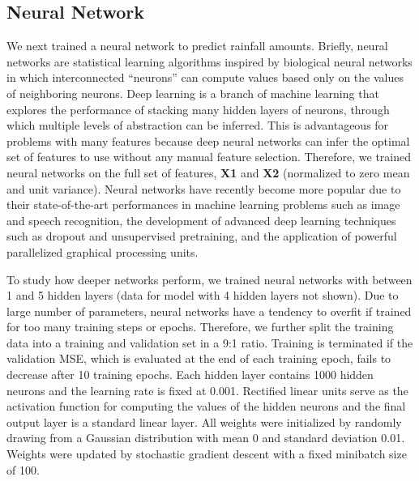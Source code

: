 \documentclass[12pt] {article}
\begin{document}
\subsection{Neural Network}
We next trained a neural network to predict rainfall amounts. Briefly, neural networks are statistical learning algorithms inspired by biological neural networks in which interconnected ``neurons'' can compute values based only on the values of neighboring neurons. Deep learning is a branch of machine learning that explores the performance of stacking many hidden layers of neurons, through which multiple levels of abstraction can be inferred. This is advantageous for problems with many features because deep neural networks can infer the optimal set of features to use without any manual feature selection. Therefore, we trained neural networks on the full set of features, \textbf{X1} and \textbf{X2} (normalized to zero mean and unit variance). Neural networks have recently become more popular due to their state-of-the-art performances in machine learning problems such as image and speech recognition, the development of advanced deep learning techniques such as dropout and unsupervised pretraining, and the application of powerful parallelized graphical processing units.

To study how deeper networks perform, we trained neural networks with between 1 and 5 hidden layers (data for model with 4 hidden layers not shown). Due to large number of parameters, neural networks have a tendency to overfit if trained for too many training steps or epochs. Therefore, we further split the training data into a training and validation set in a 9:1 ratio. Training is terminated if the validation MSE, which is evaluated at the end of each training epoch, fails to decrease after 10 training epochs. Each hidden layer contains 1000 hidden neurons and the learning rate is fixed at 0.001. Rectified linear units serve as the activation function for computing the values of the hidden neurons and the final output layer is a standard linear layer. All weights were initialized by randomly drawing from a Gaussian distribution with mean 0 and standard deviation 0.01. Weights were updated by stochastic gradient descent with a fixed minibatch size of 100.
\end{document}
